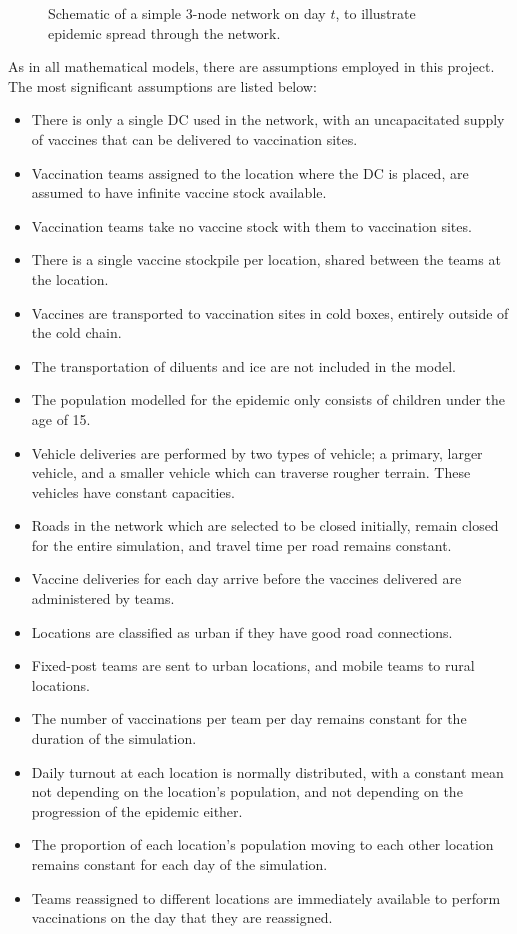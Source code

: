 \begin{figure}[ht!]{\textwidth}
    \centering
    \resizebox{0.75\textwidth}{!}{}
    \caption{Schematic of a simple 3-node network on day $t$, to illustrate epidemic spread through the network.}
    \label{fig:meth_SEIRschem}
\end{figure}

As in all mathematical models, there are assumptions employed in this project. The most significant assumptions are listed below:
\begin{itemize}
    \item There is only a single DC used in the network, with an uncapacitated supply of vaccines that can be delivered to vaccination sites. 
    \item Vaccination teams assigned to the location where the DC is placed, are assumed to have infinite vaccine stock available.
    \item Vaccination teams take no vaccine stock with them to vaccination sites.
    \item There is a single vaccine stockpile per location, shared between the teams at the location.
    \item Vaccines are transported to vaccination sites in cold boxes, entirely outside of the cold chain.
    \item The transportation of diluents and ice are not included in the model.
    \item The population modelled for the epidemic only consists of children under the age of 15.
    \item Vehicle deliveries are performed by two types of vehicle; a primary, larger vehicle, and a smaller vehicle which can traverse rougher terrain. These vehicles have constant capacities.
    \item Roads in the network which are selected to be closed initially, remain closed for the entire simulation, and travel time per road remains constant.
    \item Vaccine deliveries for each day arrive before the vaccines delivered are administered by teams.
    \item Locations are classified as urban if they have good road connections.
    \item Fixed-post teams are sent to urban locations, and mobile teams to rural locations. 
    \item The number of vaccinations per team per day remains constant for the duration of the simulation.
    \item Daily turnout at each location is normally distributed, with a constant mean not depending on the location's population, and not depending on the progression of the epidemic either.
    \item The proportion of each location's population moving to each other location remains constant for each day of the simulation.
    \item Teams reassigned to different locations are immediately available to perform vaccinations on the day that they are reassigned.
\end{itemize}

